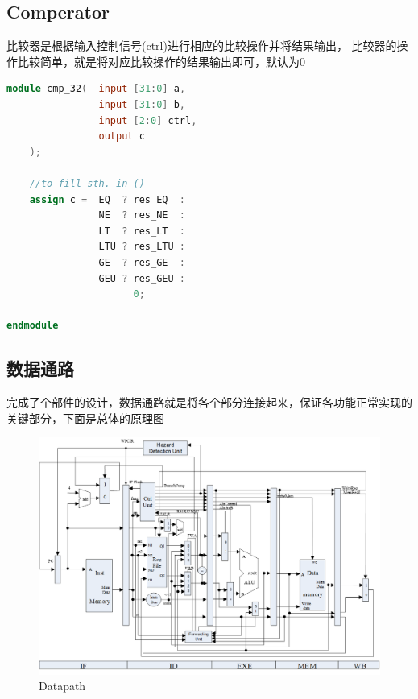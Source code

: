 \subsection{Comperator}
比较器是根据输入控制信号(ctrl)进行相应的比较操作并将结果输出，
比较器的操作比较简单，就是将对应比较操作的结果输出即可，默认为0

\begin{lstlisting}[language = {verilog}]
module cmp_32(  input [31:0] a,
                input [31:0] b,
                input [2:0] ctrl,
                output c
    );

    //to fill sth. in ()
    assign c =  EQ  ? res_EQ  : 
                NE  ? res_NE  : 
                LT  ? res_LT  : 
                LTU ? res_LTU :
                GE  ? res_GE  :
                GEU ? res_GEU :
                      0;          

endmodule
\end{lstlisting}

\subparagraph{}

\subsection{数据通路}
完成了个部件的设计，数据通路就是将各个部分连接起来，保证各功能正常实现的关键部分，下面是总体的原理图

\begin{figure}[H] %
    \centering %
    \includegraphics[width=1.0\textwidth]{DataPath.png} %
    \caption{Datapath} %
    \label{Fig.6} %
\end{figure}

